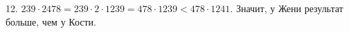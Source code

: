 12. $239\cdot2478=239\cdot2\cdot1239=478\cdot1239<478\cdot1241.$ Значит, у Жени результат больше, чем у Кости.\\
